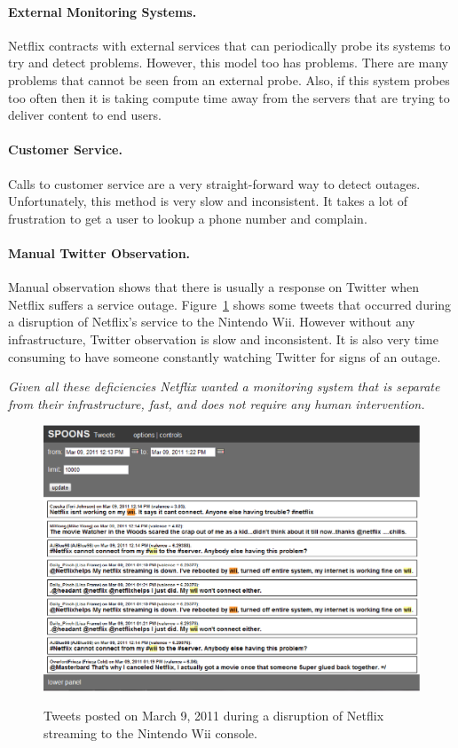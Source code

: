 \documentclass[12pt]{ucthesis}
\newcommand{\captionfonts}{\small\bf\ssp}
\begin{document}
\paragraph{External Monitoring Systems.}
Netflix contracts with external services that can periodically probe its systems to try and detect problems.
However, this model too has problems. There are many problems that cannot be seen from an external probe.
Also, if this system probes too often then it is taking compute time away from the servers that are trying to deliver
content to end users.

\paragraph{Customer Service.}
Calls to customer service are a very straight-forward way to detect outages.
Unfortunately, this method is very slow and inconsistent. It takes a lot of frustration to get a user to
lookup a phone number and complain.

\paragraph{Manual Twitter Observation.}
Manual observation shows that there is usually a response on Twitter when Netflix suffers a service
outage. Figure~\ref{fig:tweetEx} shows some tweets that occurred during a disruption of Netflix's service to
the Nintendo Wii. However without any infrastructure, Twitter observation is slow and inconsistent.
It is also very time consuming to have someone constantly watching Twitter for signs of an outage.

\emph{Given all these deficiencies Netflix wanted a monitoring system that is separate from their infrastructure,
fast, and does not require any human intervention\cite{kevin}.}

\begin{figure}
   \begin{center}
      \includegraphics[width=140mm]{images/tweetexample.eps}
      \captionfonts
      \caption[Outage Tweets Example]{Tweets posted on March 9, 2011 during a disruption of Netflix
                                       streaming to the Nintendo Wii console.}
      \label{fig:tweetEx}
   \end{center}
\end{figure}
\end{document}

